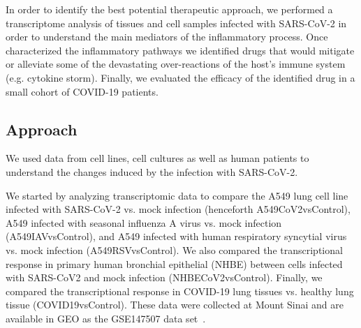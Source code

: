 In order to identify the best potential therapeutic approach, we performed a transcriptome analysis of tissues and cell samples infected with SARS-CoV-2 in order to understand the main mediators of the inflammatory process. Once characterized the inflammatory pathways we identified drugs that would mitigate or alleviate some of the devastating over-reactions of the host's immune system (e.g. cytokine storm). Finally, we evaluated the efficacy of the identified drug in a small cohort of COVID-19 patients.

\subsection{Approach}

We used data from cell lines, cell cultures as well as human patients to understand the changes induced by the infection with SARS-CoV-2. 


We started by analyzing transcriptomic data to compare the A549 lung cell line infected with SARS-CoV-2 vs. mock infection  (henceforth A549CoV2vsControl), A549 infected with seasonal influenza A virus vs. mock infection   (A549IAVvsControl), and A549 infected with human respiratory syncytial virus vs. mock infection  (A549RSVvsControl). We also compared the transcriptional response in primary human bronchial epithelial (NHBE) between cells infected with SARS-CoV2 and mock infection  (NHBECoV2vsControl). Finally, we compared the transcriptional response in COVID-19 lung tissues vs. healthy lung tissue  (COVID19vsControl). 
These data were collected at Mount Sinai and are available in GEO as the GSE147507 data set~\cite{Blanco-Melo:2020}. 

